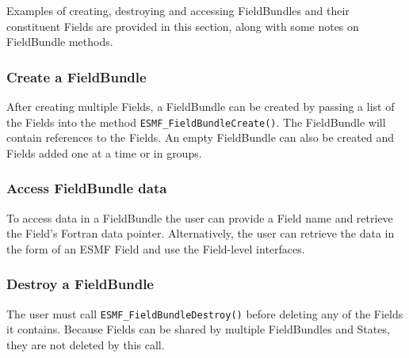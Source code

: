 

Examples of creating, destroying and accessing FieldBundles and their
constituent Fields are provided in this section, along with some
notes on FieldBundle methods.

\subsubsection{Create a FieldBundle}

After creating multiple Fields, a FieldBundle
can be created by passing a list of the Fields into the 
method \newline
{\tt ESMF\_FieldBundleCreate()}.  The FieldBundle will contain
references to the Fields.  An empty FieldBundle can also be created
and Fields added one at a time or in groups.

\subsubsection{Access FieldBundle data}

To access data in a FieldBundle the user can provide a Field
name and retrieve the Field's Fortran data pointer.  Alternatively,
the user can retrieve the data in the form of an ESMF 
Field and use the Field-level interfaces.

\subsubsection{Destroy a FieldBundle}

The user must call {\tt ESMF\_FieldBundleDestroy()} before 
deleting any of the Fields it contains.  Because Fields
can be shared by multiple FieldBundles and States, they are
not deleted by this call.


